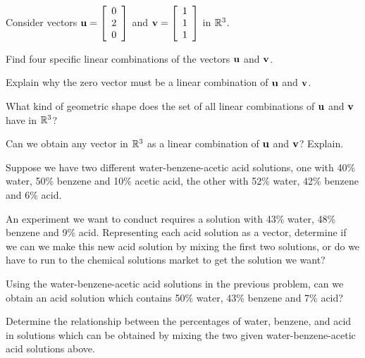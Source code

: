 \item Consider vectors $\mathbf{u}=\left[ \begin{array}{c} 0\\ 2\\0 \end{array} \right]$ and $\mathbf{v}=\left[ \begin{array}{c} 1\\ 1\\1 \end{array} \right]$ in $\mathbb{R}^3$. 
	\ba
	\item Find four specific linear combinations of the vectors $\mathbf{u}$ and $\mathbf{v}$.
	\item Explain why the zero vector must be a linear combination of $\mathbf{u}$ and $\mathbf{v}$. 
	\item What kind of geometric shape does the set of all linear combinations of $\mathbf{u}$ and $\mathbf{v}$ have in $\mathbb{R}^3$? 
	\item Can we obtain any vector in $\mathbb{R}^3$ as a linear combination of $\mathbf{u}$ and $\mathbf{v}$? Explain.
	\ea

\item \label{ex:1_d_acid} Suppose we have two different water-benzene-acetic acid solutions, one with 40\% water, 50\% benzene and 10\% acetic acid, the other with 52\% water, 42\% benzene and 6\% acid. 
	\ba
	\item An experiment we want to conduct requires a solution with 43\% water, 48\% benzene and 9\% acid. Representing each acid solution as a vector, determine if we can we make this new acid solution by mixing the first two solutions, or do we have to run to the chemical solutions market to get the solution we want?
	\item Using the water-benzene-acetic acid solutions in the previous problem, can we obtain an acid solution which contains 50\% water, 43\% benzene and 7\% acid?
	\item Determine the relationship between the percentages of water, benzene, and acid in solutions which can be obtained by mixing the two given water-benzene-acetic acid solutions above. 
	\ea
	
